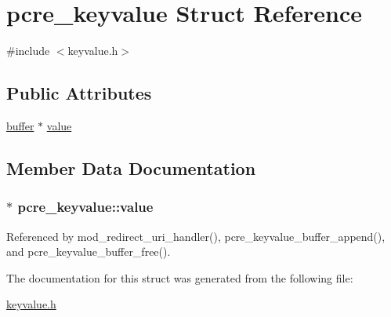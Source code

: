 \hypertarget{structpcre__keyvalue}{\section{pcre\-\_\-keyvalue Struct Reference}
\label{structpcre__keyvalue}
}


{\ttfamily \#include $<$keyvalue.\-h$>$}

\subsection*{Public Attributes}
\begin{DoxyCompactItemize}
\item 
\hyperlink{structbuffer}{buffer} $\ast$ \hyperlink{structpcre__keyvalue_a6765b457344195027073c698f8badd17}{value}
\end{DoxyCompactItemize}


\subsection{Member Data Documentation}
\hypertarget{structpcre__keyvalue_a6765b457344195027073c698f8badd17}{
\subsubsection[{value}]{$\ast$ pcre\-\_\-keyvalue\-::value}}\label{structpcre__keyvalue_a6765b457344195027073c698f8badd17}


Referenced by mod\-\_\-redirect\-\_\-uri\-\_\-handler(), pcre\-\_\-keyvalue\-\_\-buffer\-\_\-append(), and pcre\-\_\-keyvalue\-\_\-buffer\-\_\-free().



The documentation for this struct was generated from the following file\-:\begin{DoxyCompactItemize}
\item 
\hyperlink{keyvalue_8h}{keyvalue.\-h}\end{DoxyCompactItemize}
